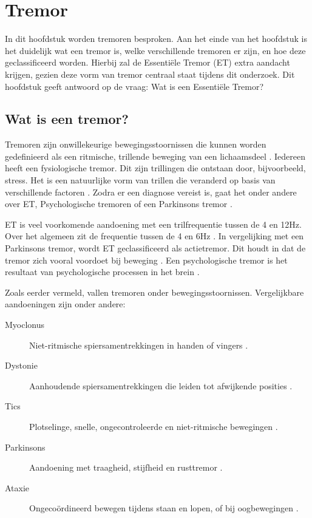 \section{Tremor}
\label{section:tremor}

In dit hoofdstuk worden tremoren besproken.
Aan het einde van het hoofdstuk is het duidelijk wat een tremor is,
welke verschillende tremoren er zijn, en hoe deze geclassificeerd worden.
Hierbij zal de Essentiële Tremor (ET) extra aandacht krijgen,
gezien deze vorm van tremor centraal staat tijdens dit onderzoek.
Dit hoofdstuk geeft antwoord op de vraag: Wat is een Essentiële Tremor?

\subsection{Wat is een tremor?}

Tremoren zijn onwillekeurige bewegingsstoornissen die kunnen worden gedefinieerd als een ritmische,
trillende beweging van een lichaamsdeel \cite{knf2022}.
Iedereen heeft een fysiologische tremor. Dit zijn trillingen die ontstaan door, bijvoorbeeld, stress.
Het is een natuurlijke vorm van trillen die veranderd op basis van verschillende factoren \cite{hersenstichting2024,erasmus2022}.
Zodra er een diagnose vereist is, gaat het onder andere over ET,
Psychologische tremoren of een Parkinsons tremor \cite{elsevier2022}.

ET is veel voorkomende aandoening met een trilfrequentie tussen de 4 en 12Hz.
Over het algemeen zit de frequentie tussen de 4 en 6Hz \cite{frontiers2022}.
In vergelijking met een Parkinsons tremor, wordt ET geclassificeerd als actietremor.
Dit houdt in dat de tremor zich vooral voordoet bij beweging \cite{knf2022,elsevier2022,frontiers2022}.
Een psychologische tremor is het resultaat van psychologische processen in het brein \cite{elsevier2022}.

Zoals eerder vermeld, vallen tremoren onder bewegingsstoornissen.
Vergelijkbare aandoeningen zijn onder andere:

\begin{description}
    \item[Myoclonus] Niet-ritmische spiersamentrekkingen in handen of vingers \cite{knf2022}.
    \item[Dystonie] Aanhoudende spiersamentrekkingen die leiden tot afwijkende posities \cite{knf2022,erasmus2022,elsevier2022}.
    \item[Tics] Plotselinge, snelle, ongecontroleerde en niet-ritmische bewegingen \cite{knf2022}.
    \item[Parkinsons] Aandoening met traagheid, stijfheid en rusttremor \cite{knf2022,erasmus2022,elsevier2022,frontiers2022}.
    \item[Ataxie] Ongecoördineerd bewegen tijdens staan en lopen, of bij oogbewegingen \cite{knf2022}.
\end{description}

